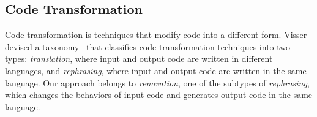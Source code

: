 \subsection{Code Transformation}

Code transformation is techniques that modify code into a different form.  
Visser devised a taxonomy~\cite{visser2001survey} that classifies code transformation
techniques into two types: 
\textit{translation}, where input and output code are written in different
languages, and \textit{rephrasing}, where input and output code are written in
the same language.
Our approach belongs to \textit{renovation}, one of the subtypes of
\textit{rephrasing}, which changes the behaviors of input code and generates
output code in the same language.


